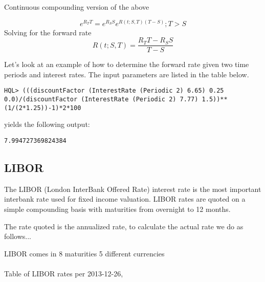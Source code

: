 \documentclass[11pt,a4paper]{article}
\numberwithin{equation}{section}
\begin{document}
Continuous compounding version of the above

\[
e^{R_TT}=e^{R_SS}e^{R(t;S,T)(T-S)};T>S
\]
Solving for the forward rate
\[
R(t;S,T)=\frac{R_TT-R_SS}{T-S}
\]

Let's look at an example of how to determine the forward rate given two time periods and interest rates. The input parameters are listed in the table below.


\FrameSep
\begin{lstlisting}
HQL> (((discountFactor (InterestRate (Periodic 2) 6.65) 0.25 0.0)/(discountFactor (InterestRate (Periodic 2) 7.77) 1.5))**(1/(2*1.25))-1)*2*100
\end{lstlisting}
yields the following output:
\FrameSep
\begin{lstlisting}[style=Output]
7.994727369824384
\end{lstlisting}

\subsection{LIBOR}
The LIBOR (London InterBank Offered Rate) interest rate is the most important interbank rate
used for fixed income valuation. LIBOR rates are quoted on a simple compounding basis with maturities
from overnight to 12 months.

The rate quoted is the annualized rate, to calculate the actual rate we do as follows...

LIBOR comes in 8 maturities
5 different currencies
\\
\\
Table of LIBOR rates per 2013-12-26,

\end{document}
